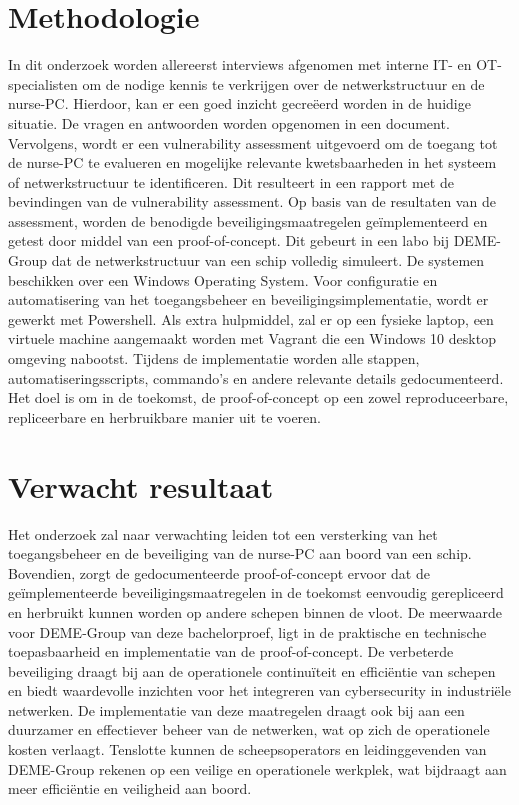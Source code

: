 \section{Methodologie}%
\label{sec:methodologie}
In dit onderzoek worden allereerst interviews afgenomen met interne IT- en OT-specialisten om de nodige kennis te verkrijgen over de netwerkstructuur en de nurse-PC.
Hierdoor, kan er een goed inzicht gecreëerd worden in de huidige situatie. De vragen en antwoorden worden opgenomen in een document.
Vervolgens, wordt er een vulnerability assessment uitgevoerd om de toegang tot de nurse-PC te evalueren en mogelijke relevante kwetsbaarheden in het systeem of netwerkstructuur te identificeren. 
Dit resulteert in een rapport met de bevindingen van de vulnerability assessment.
Op basis van de resultaten van de assessment, worden de benodigde beveiligingsmaatregelen geïmplementeerd en getest door middel van een proof-of-concept. Dit gebeurt in een labo bij DEME-Group dat de netwerkstructuur van een schip volledig simuleert.  
De systemen beschikken over een Windows Operating System. Voor configuratie en automatisering van het toegangsbeheer en beveiligingsimplementatie, wordt er gewerkt met Powershell. 
Als extra hulpmiddel, zal er op een fysieke laptop, een virtuele machine aangemaakt worden met Vagrant die een Windows 10 desktop omgeving nabootst.
Tijdens de implementatie worden alle stappen, automatiseringsscripts, commando's en andere relevante details gedocumenteerd. Het doel is om in de toekomst, de proof-of-concept op een zowel reproduceerbare, repliceerbare en herbruikbare manier uit te voeren.


\section{Verwacht resultaat}%
\label{sec:verwachte_resultaten}
Het onderzoek zal naar verwachting leiden tot een versterking van het toegangsbeheer en de beveiliging van de nurse-PC aan boord van een schip.
Bovendien, zorgt de gedocumenteerde proof-of-concept ervoor dat de geïmplementeerde beveiligingsmaatregelen in de toekomst eenvoudig gerepliceerd en herbruikt kunnen worden op andere schepen binnen de vloot.
De meerwaarde voor DEME-Group van deze bachelorproef, ligt in de praktische en technische toepasbaarheid en implementatie van de proof-of-concept. 
De verbeterde beveiliging draagt bij aan de operationele continuïteit en efficiëntie van schepen en biedt waardevolle inzichten voor het integreren van cybersecurity in industriële netwerken. 
De implementatie van deze maatregelen draagt ook bij aan een duurzamer en effectiever beheer van de netwerken, wat op zich de operationele kosten verlaagt.
Tenslotte kunnen de scheepsoperators en leidinggevenden van DEME-Group rekenen op een veilige en operationele werkplek, wat bijdraagt aan meer efficiëntie en veiligheid aan boord.



